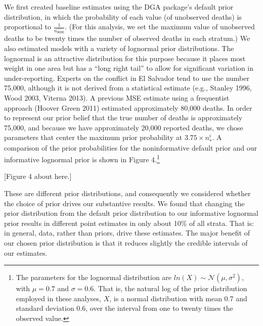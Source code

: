 \documentclass[11pt,]{article}
\let\rmarkdownfootnote\footnote%
\def\footnote{\protect\rmarkdownfootnote}
\begin{document}
We first created baseline estimates using the DGA package's default
prior distribution, in which the probability of each value (of
unobserved deaths) is proportional to \(\frac{1}{\hat{n_{0000}}}\). (For
this analysis, we set the maximum value of unobserved deaths to be
twenty times the number of observed deaths in each stratum.) We also
estimated models with a variety of lognormal prior distributions. The
lognormal is an attractive distribution for this purpose because it
places most weight in one area but has a ``long right tail'' to allow
for significant variation in under-reporting. Experts on the conflict in
El Salvador tend to use the number 75,000, although it is not derived
from a statistical estimate (e.g., Stanley 1996, Wood 2003, Viterna
2013). A previous MSE estimate using a frequentist approach (Hoover
Green 2011) estimated approximately 80,000 deaths. In order to represent
our prior belief that the true number of deaths is approximately 75,000,
and because we have approximately 20,000 reported deaths, we chose
parameters that center the maximum prior probability at
\(3.75\times n^{i}_{*}\). A comparison of the prior probabilities for
the noninformative default prior and our informative lognormal prior is
shown in Figure 4.\footnote{The parameters for the lognormal
  distribution are \(ln(X) \sim \mathcal{N} (\mu, \sigma^2)\), with
  \(\mu = 0.7\) and \(\sigma = 0.6\). That is, the natural log of the
  prior distribution employed in these analyses, \(X\), is a normal
  distribution with mean 0.7 and standard deviation 0.6, over the
  interval from one to twenty times the observed value.}

{[}Figure 4 about here.{]}

These are different prior distributions, and consequently we considered
whether the choice of prior drives our substantive results. We found
that changing the prior distribution from the default prior distribution
to our informative lognormal prior results in different point estimates
in only about 10\% of all strata. That is: in general, data, rather than
priors, drive these estimates. The major benefit of our chosen prior
distribution is that it reduces slightly the credible intervals of our
estimates.
\end{document}
